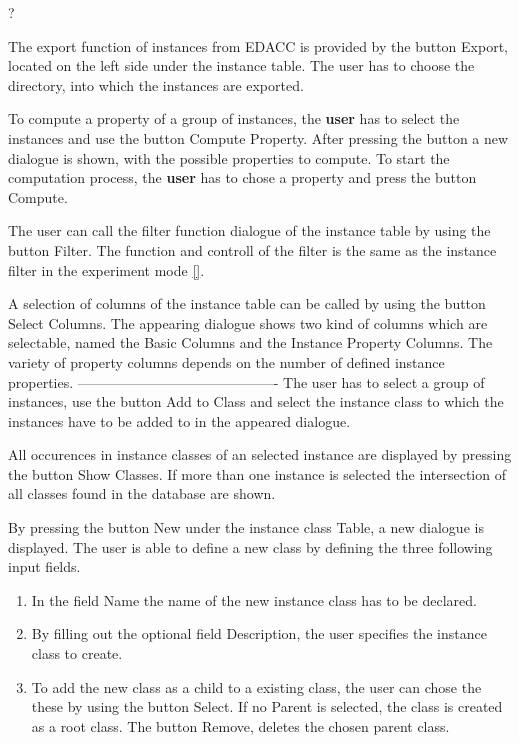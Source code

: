  ?

 The export function of instances from EDACC is provided by the button Export, located on the left side under the instance table. The user has to choose the directory, into which the instances are exported.

 To compute a property of a group of instances, the \textbf{user} has to select the instances and use the button Compute Property. After pressing the button a new dialogue is shown, with the possible properties to compute. To start the computation process,  the \textbf{user} has to chose a property and press the button Compute.

 The user can call the filter function dialogue of the instance table by using the button Filter. The function and controll of the filter is the same as the instance filter in the experiment mode \ref{}.

 A selection of columns of the instance table can be called by using the button Select Columns. The appearing dialogue shows two kind of columns which are selectable, named the Basic Columns and the Instance Property Columns. The variety of property columns depends on the number of defined instance properties.  
-------------------------------------------
 The user has to select a group of instances, use the button Add to Class and select the instance class to which the instances have to be added to in the appeared dialogue.

 All occurences in instance classes of an selected instance are displayed by pressing the button Show Classes. If more than one instance is selected the intersection of all classes found in the database are shown.

\label{createInstanceClass} By pressing the button New under the instance class Table, a new dialogue is displayed. The user is able to define a new class by defining the three following input fields.
\begin{enumerate}
	\item In the field Name the name of the new instance class has to be declared.
	\item By filling out the optional field Description, the user specifies the instance class to create.
	\item To add the new class as a child to a existing class, the user can chose the these by using the button Select. If no Parent is selected, the class is created as a root class. The button Remove, deletes the chosen parent class.
\end{enumerate}

